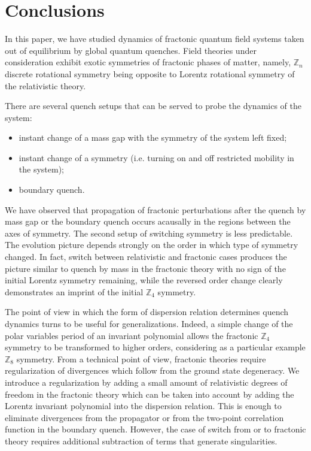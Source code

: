 \documentclass[a4paper,12pt]{article}
\newcommand{\Z}[1]{\mathbb{Z}_{#1}}
\begin{document}
\section{Conclusions}
\label{sec:conclusions}

In this paper, we have studied dynamics of fractonic quantum field systems taken out of equilibrium by global quantum quenches. Field theories under consideration exhibit exotic symmetries of fractonic phases of matter, namely, $\Z{n}$ discrete rotational symmetry being opposite to Lorentz rotational symmetry of the relativistic theory.

There are several quench setups that can be served to probe the dynamics of the system:
\begin{itemize}
    \item instant change of a mass gap with the symmetry of the system left fixed;
    \item instant change of a symmetry (i.e. turning on and off restricted mobility in the system);
    \item boundary quench.
\end{itemize} 
  
We have observed that propagation of fractonic perturbations after the quench by mass gap or the boundary quench occurs acausally in the regions between the axes of symmetry. The second setup of switching symmetry is less predictable. The evolution picture depends strongly on the order in which type of symmetry changed. In fact, switch between relativistic and fractonic cases produces the picture similar to quench by mass in the fractonic theory with no sign of the initial Lorentz symmetry remaining, while the reversed order change clearly demonstrates an imprint of the initial $\Z4$ symmetry.

The point of view in which the form of dispersion relation determines quench dynamics turns to be useful for generalizations. Indeed, a simple change of the polar variables period of an invariant polynomial allows the fractonic $\Z4$ symmetry to be transformed to higher orders, considering as a particular example $\Z8$ symmetry. From a technical point of view, fractonic theories require regularization of divergences which follow from the ground state degeneracy. We introduce a regularization by adding a small amount of relativistic degrees of freedom in the fractonic theory which can be taken into account by adding the Lorentz invariant polynomial into the dispersion relation. This is enough to eliminate divergences from the propagator or from the two-point correlation function in the boundary quench. However, the case of switch from or to fractonic theory requires additional subtraction of terms that generate singularities.
\end{document}
